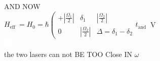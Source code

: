 \documentclass[10pt]{article}
\begin{document}
AND NOW\\
$H_{\text {eff }}=H_{0}=\hbar\left(\begin{array}{ccc}+\left|\frac{\Omega_{1}}{2}\right| & \delta_{1} & \left|\frac{\Omega_{2}}{2}\right| \\ 0 & \left|\frac{\Omega_{2}}{2}\right| & \Delta=\delta_{1}-\delta_{2}\end{array}\right. t_{\text {and }}$ V\\
\includegraphics[max width=\textwidth, center]{2025_10_16_1968b45f52c890c3dc16g-3}\\
the two lasers can not BE TOO Close IN $\omega$
\end{document}
